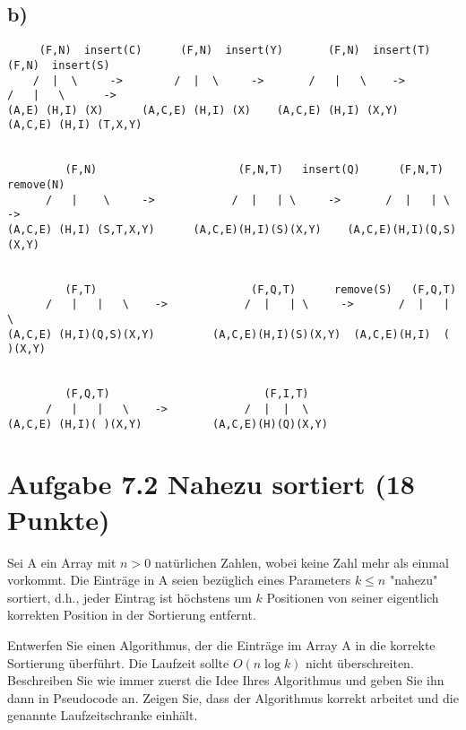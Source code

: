 \documentclass[a4paper]{article}
\begin{document}
\subsection*{b)}

\begin{verbatim}
     (F,N)  insert(C)      (F,N)  insert(Y)       (F,N)  insert(T)       (F,N)  insert(S)
    /  |  \     ->        /  |  \     ->       /   |   \    ->         /   |   \      ->
(A,E) (H,I) (X)      (A,C,E) (H,I) (X)    (A,C,E) (H,I) (X,Y)    (A,C,E) (H,I) (T,X,Y)


         (F,N)                      (F,N,T)   insert(Q)      (F,N,T)   remove(N)
      /   |    \     ->            /  |   | \     ->       /  |   | \   ->
(A,C,E) (H,I) (S,T,X,Y)      (A,C,E)(H,I)(S)(X,Y)    (A,C,E)(H,I)(Q,S)(X,Y)


         (F,T)                        (F,Q,T)      remove(S)   (F,Q,T)
      /   |   |   \    ->            /  |   | \     ->       /  |   | \
(A,C,E) (H,I)(Q,S)(X,Y)         (A,C,E)(H,I)(S)(X,Y)  (A,C,E)(H,I)  ( )(X,Y)


         (F,Q,T)                        (F,I,T)
      /   |   |   \    ->            /  |  |  \ 
(A,C,E) (H,I)( )(X,Y)           (A,C,E)(H)(Q)(X,Y)

\end{verbatim}

\section*{Aufgabe 7.2 Nahezu sortiert (18 Punkte)}

Sei A ein Array mit \( n > 0 \) natürlichen Zahlen, wobei keine Zahl mehr als einmal vorkommt. Die Einträge in A seien bezüglich eines Parameters \( k \leq n \) "nahezu" sortiert, d.h., jeder Eintrag ist höchstens um \( k \) Positionen von seiner eigentlich korrekten Position in der Sortierung entfernt.

Entwerfen Sie einen Algorithmus, der die Einträge im Array A in die korrekte Sortierung überführt. Die Laufzeit sollte \( O(n \log k) \) nicht überschreiten. Beschreiben Sie wie immer zuerst die Idee Ihres Algorithmus und geben Sie ihn dann in Pseudocode an. Zeigen Sie, dass der Algorithmus korrekt arbeitet und die genannte Laufzeitschranke einhält.
\end{document}

